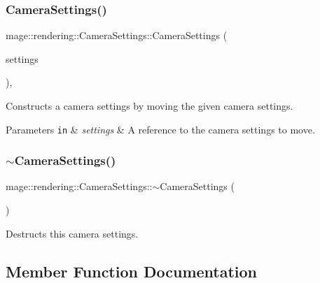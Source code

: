 \subsubsection{\texorpdfstring{Camera\+Settings()}{CameraSettings()}\hspace{0.1cm}{\footnotesize\ttfamily [3/3]}}
{\footnotesize\ttfamily mage\+::rendering\+::\+Camera\+Settings\+::\+Camera\+Settings (\begin{DoxyParamCaption}\item[{\mbox{\hyperlink{classmage_1_1rendering_1_1_camera_settings}{Camera\+Settings}} \&\&}]{settings }\end{DoxyParamCaption})\hspace{0.3cm}{\ttfamily [default]}, {\ttfamily [noexcept]}}

Constructs a camera settings by moving the given camera settings.


\begin{DoxyParams}[1]{Parameters}
\mbox{\tt in}  & {\em settings} & A reference to the camera settings to move. \\
\hline
\end{DoxyParams}
\mbox{\label{classmage_1_1rendering_1_1_camera_settings_a0e5badc4e959b8ddad0d7df2da4c934f}} 
\subsubsection{\texorpdfstring{$\sim$\+Camera\+Settings()}{~CameraSettings()}}
{\footnotesize\ttfamily mage\+::rendering\+::\+Camera\+Settings\+::$\sim$\+Camera\+Settings (\begin{DoxyParamCaption}{ }\end{DoxyParamCaption})\hspace{0.3cm}{\ttfamily [default]}}

Destructs this camera settings. 

\subsection{Member Function Documentation}
\mbox{\label{classmage_1_1rendering_1_1_camera_settings_a921ff9ebe3ff05890f0e3dd8b71fcb7f}} 

